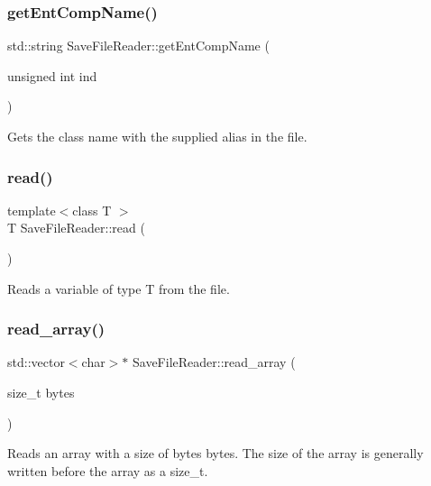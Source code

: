 \subsubsection{\texorpdfstring{get\+Ent\+Comp\+Name()}{getEntCompName()}}
{\footnotesize\ttfamily std\+::string Save\+File\+Reader\+::get\+Ent\+Comp\+Name (\begin{DoxyParamCaption}\item[{unsigned int}]{ind }\end{DoxyParamCaption})\hspace{0.3cm}{\ttfamily [inline]}}

Gets the class name with the supplied alias in the file. \mbox{\label{class_save_file_reader_aaacf90b2df172da6dbd4f372c57df0a2}} 
\subsubsection{\texorpdfstring{read()}{read()}}
{\footnotesize\ttfamily template$<$class T $>$ \\
T Save\+File\+Reader\+::read (\begin{DoxyParamCaption}{ }\end{DoxyParamCaption})\hspace{0.3cm}{\ttfamily [inline]}}

Reads a variable of type T from the file. \mbox{\label{class_save_file_reader_a7272a5a3877eb91ed668b879e7f66398}} 
\subsubsection{\texorpdfstring{read\+\_\+array()}{read\_array()}}
{\footnotesize\ttfamily std\+::vector$<$char$>$$\ast$ Save\+File\+Reader\+::read\+\_\+array (\begin{DoxyParamCaption}\item[{size\+\_\+t}]{bytes }\end{DoxyParamCaption})\hspace{0.3cm}{\ttfamily [inline]}}

Reads an array with a size of \textquotesingle{}bytes\textquotesingle{} bytes. The size of the array is generally written before the array as a size\+\_\+t. \mbox{\label{class_save_file_reader_a6fe25b46135c278be875bec0ef19bdf3}} 
